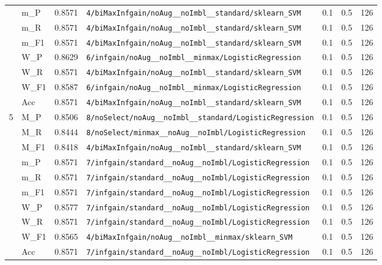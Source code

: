 \begin{table}[htbp]
\begin{tabular}{|c|l|c|>{\ttfamily\footnotesize}p{7.2cm}|c|c|c|}
 & m\_P & 0.8571 & \texttt{4/biMaxInfgain/noAug\_\_noImbl\_\_standard/sklearn\_SVM} & 0.1 & 0.5  & 126 \\ 
 & m\_R & 0.8571 & \texttt{4/biMaxInfgain/noAug\_\_noImbl\_\_standard/sklearn\_SVM} & 0.1 & 0.5  & 126 \\ 
 & m\_F1 & 0.8571 & \texttt{4/biMaxInfgain/noAug\_\_noImbl\_\_standard/sklearn\_SVM} & 0.1 & 0.5  & 126 \\ 
 & W\_P & 0.8629 & \texttt{6/infgain/noAug\_\_noImbl\_\_minmax/LogisticRegression} & 0.1 & 0.5  & 126 \\ 
 & W\_R & 0.8571 & \texttt{4/biMaxInfgain/noAug\_\_noImbl\_\_standard/sklearn\_SVM} & 0.1 & 0.5  & 126 \\ 
 & W\_F1 & 0.8587 & \texttt{6/infgain/noAug\_\_noImbl\_\_minmax/LogisticRegression} & 0.1 & 0.5  & 126 \\ 
 & Acc & 0.8571 & \texttt{4/biMaxInfgain/noAug\_\_noImbl\_\_standard/sklearn\_SVM} & 0.1 & 0.5  & 126 \\ 
\hline
\multirow{10}{*}{5} & M\_P & 0.8506 & \texttt{8/noSelect/noAug\_\_noImbl\_\_standard/LogisticRegression} & 0.1 & 0.5  & 126 \\ 
 & M\_R & 0.8444 & \texttt{8/noSelect/minmax\_\_noAug\_\_noImbl/LogisticRegression} & 0.1 & 0.5  & 126 \\ 
 & M\_F1 & 0.8418 & \texttt{4/biMaxInfgain/noAug\_\_noImbl\_\_standard/sklearn\_SVM} & 0.1 & 0.5  & 126 \\ 
 & m\_P & 0.8571 & \texttt{7/infgain/standard\_\_noAug\_\_noImbl/LogisticRegression} & 0.1 & 0.5  & 126 \\ 
 & m\_R & 0.8571 & \texttt{7/infgain/standard\_\_noAug\_\_noImbl/LogisticRegression} & 0.1 & 0.5  & 126 \\ 
 & m\_F1 & 0.8571 & \texttt{7/infgain/standard\_\_noAug\_\_noImbl/LogisticRegression} & 0.1 & 0.5  & 126 \\ 
 & W\_P & 0.8577 & \texttt{7/infgain/standard\_\_noAug\_\_noImbl/LogisticRegression} & 0.1 & 0.5  & 126 \\ 
 & W\_R & 0.8571 & \texttt{7/infgain/standard\_\_noAug\_\_noImbl/LogisticRegression} & 0.1 & 0.5  & 126 \\ 
 & W\_F1 & 0.8565 & \texttt{4/biMaxInfgain/noAug\_\_noImbl\_\_minmax/sklearn\_SVM} & 0.1 & 0.5  & 126 \\ 
 & Acc & 0.8571 & \texttt{7/infgain/standard\_\_noAug\_\_noImbl/LogisticRegression} & 0.1 & 0.5  & 126 \\ 
\hline
\end{tabular}
\end{table}